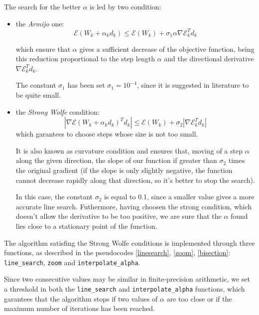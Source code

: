 			The search for the better $\alpha$ is led by two condition:
			\begin{itemize}
			\item the \textit{Armijo} one:
			\begin{equation}
			\mathcal{E}(W_k+\alpha _kd_k)\leq \mathcal{E}(W_k)+\sigma_1\alpha\nabla \mathcal{E}_k^Td_k
			\end{equation}

			which ensure that $\alpha$ gives a sufficient decrease of the objective function, being this reduction proportional to the step length $\alpha$ and the directional derivative $\nabla \mathcal{E}_k^Td_k$.

			The constant $\sigma_1$ has been set $\sigma_1=10^{-4}$, since it is suggested in literature to be quite small.

			\item the \textit{Strong Wolfe} condition:
			\begin{equation}
			|\nabla \mathcal{E}(W_k+\alpha _kd_k)^Td_k|\leq \mathcal{E}(W_k)+\sigma_2|\nabla \mathcal{E}_k^Td_k|
			\end{equation}
			which garantees to choose steps whose size is not too small.

			It is also known as curvature condition and ensures that, moving of a step $\alpha$ along the given direction, the slope of our function if greater than $\sigma_2$ times the original gradient (if the slope is only slightly negative, the function cannot decrease rapidly along that direction, so it's better to stop the search).

			In this case, the constant $\sigma_2$ is equal to 0.1, since a smaller value gives a more accurate line search.
			Futhermore, having choosen the strong condition, which doesn't allow the derivative to be too positive, we are sure that the $\alpha$ found lies close to a stationary point of the function.
			\end{itemize}

			The algorithm satisfing the Strong Wolfe conditions is implemented through three functions, as described in the pseudocodes \ref{linesearch}, \ref{zoom}, \ref{bisection}:  \texttt{line\_search}, \texttt{zoom} and \texttt{interpolate\_alpha}.

			Since two consecutive values may be similar in finite-precision arithmetic, we set a threshold in both the \texttt{line\_search} and  \texttt{interpolate\_alpha} functions, which garantees that the algorithm stops if two values of $\alpha$ are too close or if the maximum number of iterations has been reached.


